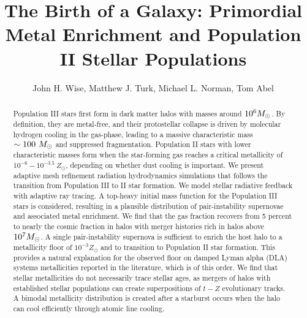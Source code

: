 \documentclass[apjl]{emulateapj}
\newcommand{\Ms}{\ifmmode{M_\odot}\else{$M_\odot$}\fi}
\begin{document}

\title{The Birth of a Galaxy: Primordial Metal Enrichment and
  Population II Stellar Populations}

\author{John H. Wise, 
  Matthew J. Turk,
  Michael L. Norman,
  Tom Abel}


\begin{abstract}

  Population III stars first form in dark matter halos with masses
  around $10^6 \Ms$.  By definition, they are metal-free, and their
  protostellar collapse is driven by molecular hydrogen cooling in the
  gas-phase, leading to a massive characteristic mass $\sim 100~\Ms$
  and suppressed fragmentation.  Population II stars with lower
  characteristic masses form when the star-forming gas reaches a
  critical metallicity of $10^{-6} - 10^{-3.5}~Z_\odot$, depending on
  whether dust cooling is important.  We present adaptive mesh
  refinement radiation hydrodynamics simulations that follows the
  transition from Population III to II star formation.  We model
  stellar radiative feedback with adaptive ray tracing.  A top-heavy
  initial mass function for the Population III stars is considered,
  resulting in a plausible distribution of pair-instability supernovae
  and associated metal enrichment.  We find that the gas fraction
  recovers from 5 percent to nearly the cosmic fraction in halos with
  merger histories rich in halos above $10^7 \Ms$.  A single
  pair-instability supernova is sufficient to enrich the host halo to
  a metallicity floor of $10^{-3} Z_\odot$ and to transition to
  Population II star formation.  This provides a natural explanation
  for the observed floor on damped Lyman alpha (DLA) systems
  metallicities reported in the literature, which is of this order.
  We find that stellar metallicities do not necessarily trace stellar
  ages, as mergers of halos with established stellar populations can
  create superpositions of $t-Z$ evolutionary tracks.  A bimodal
  metallicity distribution is created after a starburst occurs when
  the halo can cool efficiently through atomic line cooling.

\end{abstract}
\end{document}
